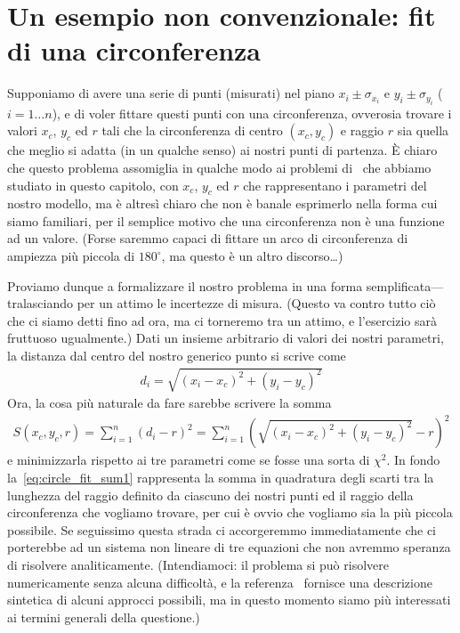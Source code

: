 \section{Un esempio non convenzionale: fit di una circonferenza}

\danger Supponiamo di avere una serie di punti (misurati) nel piano $x_i \pm \sigma_{x_i}$
e $y_i \pm \sigma_{y_i}$ ($i = 1\ldots n$), e di voler fittare questi
punti con una circonferenza, ovverosia trovare i valori $x_c$, $y_c$ ed $r$
tali che la circonferenza di centro $(x_c, y_c)$ e raggio $r$ sia quella che
meglio si adatta (in un qualche senso) ai nostri punti di partenza.
\`E chiaro che questo problema assomiglia in qualche modo ai problemi di \fit\
che abbiamo studiato in questo capitolo, con $x_c$, $y_c$ ed $r$ che rappresentano
i parametri del nostro modello, ma è altresì chiaro che non è banale
esprimerlo nella forma cui siamo familiari, per il semplice motivo che una
circonferenza non è una funzione ad un valore. (Forse saremmo capaci di
fittare un arco di circonferenza di ampiezza più piccola di $180^\circ$,
ma questo è un altro discorso\ldots)

Proviamo dunque a formalizzare il nostro problema in una forma semplificata---tralasciando
per un attimo le incertezze di misura. (Questo va contro tutto ciò che ci siamo
detti fino ad ora, ma ci torneremo tra un attimo, e l'esercizio sarà fruttuoso ugualmente.)
Dati un insieme arbitrario di valori dei nostri parametri, la distanza dal centro
del nostro generico punto si scrive come
\begin{align*}
    d_i = \sqrt{(x_i - x_c)^2 + (y_i - y_c)^2}
\end{align*}
Ora, la cosa più naturale da fare sarebbe scrivere la somma
\begin{align}\label{eq:circle_fit_sum1}
    S(x_c, y_c, r) = \sum_{i=1}^n (d_i - r)^2 =
    \sum_{i=1}^n \left( \sqrt{(x_i - x_c)^2 + (y_i - y_c)^2} - r \right)^2
\end{align}
e minimizzarla rispetto ai tre parametri come se fosse una sorta di $\chi^2$.
In fondo la~\eqref{eq:circle_fit_sum1} rappresenta la somma in quadratura degli
scarti tra la lunghezza del raggio definito da ciascuno dei nostri punti ed
il raggio della circonferenza che vogliamo trovare, per cui è ovvio che
vogliamo sia la più piccola possibile. Se seguissimo questa strada
ci accorgeremmo immediatamente che ci porterebbe ad un sistema non lineare di
tre equazioni che non avremmo speranza di risolvere analiticamente.
(Intendiamoci: il problema si può risolvere numericamente senza alcuna difficoltà,
e la referenza~\cite{scipy_circular_fit} fornisce una descrizione sintetica di
alcuni approcci possibili, ma in questo momento siamo più interessati ai
termini generali della questione.)


